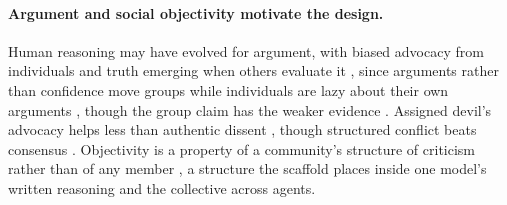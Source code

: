 \paragraph{Argument and social objectivity motivate the design.}
Human reasoning may have evolved for argument, with biased advocacy from
individuals and truth emerging when others evaluate it
\citep{mercier2011argumentative,mercier2017enigma}, since arguments rather
than confidence move groups \citep{trouche2014arguments} while individuals are
lazy about their own arguments \citep{trouche2016selective}, though the group
claim has the weaker evidence \citep{mercier2016predictions}.
Assigned devil's advocacy helps less than authentic dissent
\citep{nemeth2001devil}, though structured conflict beats consensus
\citep{schweiger1986group,schwenk1990effects}. Objectivity is a
property of a community's structure of criticism rather than of any member
\citep{longino1990science,longino2002fate,popper2011open}, a structure the
scaffold places inside one model's written reasoning and the collective across agents.
